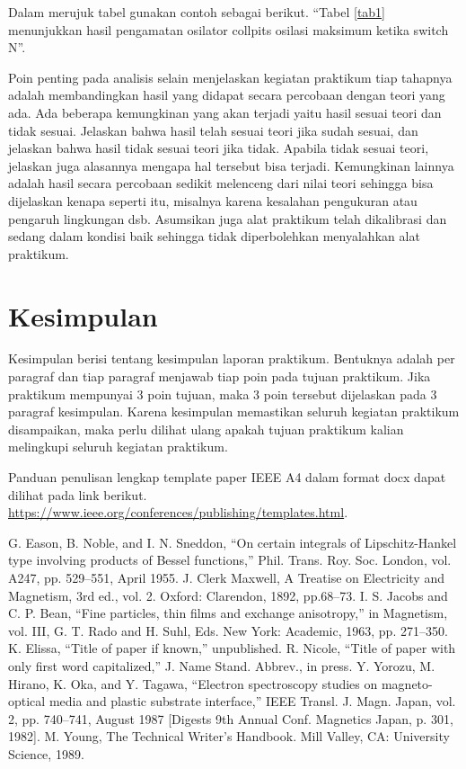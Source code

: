 \documentclass[conference]{IEEEtran}
\begin{document}
Dalam merujuk tabel gunakan contoh sebagai berikut. “Tabel \ref{tab1} menunjukkan hasil pengamatan osilator collpits osilasi maksimum ketika switch N”.

Poin penting pada analisis selain menjelaskan kegiatan praktikum tiap tahapnya adalah membandingkan hasil yang didapat secara percobaan dengan teori yang ada. Ada beberapa kemungkinan yang akan terjadi yaitu hasil sesuai teori dan tidak sesuai. Jelaskan bahwa hasil telah sesuai teori jika sudah sesuai, dan jelaskan bahwa hasil tidak sesuai teori jika tidak. Apabila tidak sesuai teori, jelaskan juga alasannya mengapa hal tersebut bisa terjadi. Kemungkinan lainnya adalah hasil secara percobaan sedikit melenceng dari nilai teori sehingga bisa dijelaskan kenapa seperti itu, misalnya karena kesalahan pengukuran atau pengaruh lingkungan dsb. Asumsikan juga alat praktikum telah dikalibrasi dan sedang dalam kondisi baik sehingga tidak diperbolehkan menyalahkan alat praktikum.

\section{Kesimpulan}
Kesimpulan berisi tentang kesimpulan laporan praktikum. Bentuknya adalah per paragraf dan tiap paragraf menjawab tiap poin pada tujuan praktikum. Jika praktikum mempunyai 3 poin tujuan, maka 3 poin tersebut dijelaskan pada 3 paragraf kesimpulan. Karena kesimpulan memastikan seluruh kegiatan praktikum disampaikan, maka perlu dilihat ulang apakah tujuan praktikum kalian melingkupi seluruh kegiatan praktikum.

Panduan penulisan lengkap template paper IEEE A4 dalam format docx dapat dilihat pada link berikut. \url{https://www.ieee.org/conferences/publishing/templates.html}.

%
\begin{thebibliography}{00}
 G. Eason, B. Noble, and I. N. Sneddon, ``On certain integrals of Lipschitz-Hankel type involving products of Bessel functions,'' Phil. Trans. Roy. Soc. London, vol. A247, pp. 529--551, April 1955.
 J. Clerk Maxwell, A Treatise on Electricity and Magnetism, 3rd ed., vol. 2. Oxford: Clarendon, 1892, pp.68--73.
 I. S. Jacobs and C. P. Bean, ``Fine particles, thin films and exchange anisotropy,'' in Magnetism, vol. III, G. T. Rado and H. Suhl, Eds. New York: Academic, 1963, pp. 271--350.
 K. Elissa, ``Title of paper if known,'' unpublished.
 R. Nicole, ``Title of paper with only first word capitalized,'' J. Name Stand. Abbrev., in press.
 Y. Yorozu, M. Hirano, K. Oka, and Y. Tagawa, ``Electron spectroscopy studies on magneto-optical media and plastic substrate interface,'' IEEE Transl. J. Magn. Japan, vol. 2, pp. 740--741, August 1987 [Digests 9th Annual Conf. Magnetics Japan, p. 301, 1982].
 M. Young, The Technical Writer's Handbook. Mill Valley, CA: University Science, 1989.
\end{thebibliography}
\end{document}
